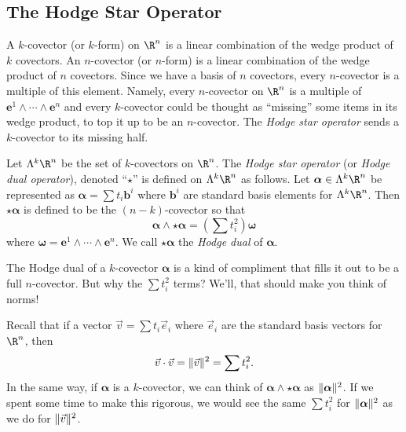 \subsection{The Hodge Star Operator}

A $k$-covector (or $k$-form) on $\R^n$ is a linear combination of the
wedge product of $k$ covectors.  An $n$-covector (or $n$-form) is a linear
combination of the wedge product of $n$ covectors.  Since we have a basis
of $n$ covectors, every $n$-covector is a multiple of this element.  Namely,
every $n$-covector on $\R^n$ is a multiple of $\bm e^1\wedge \cdots \wedge \bm e^n$
and every $k$-covector could be thought as ``missing'' some items in its wedge
product, to top it up to be an $n$-covector.  The \emph{Hodge star operator}
sends a $k$-covector to its missing half.

\begin{definition}
	Let $\Lambda^k\R^n$ be the set of $k$-covectors on $\R^n$.
	The \emph{Hodge star operator} (or \emph{Hodge dual operator}),
	denoted ``$\star$'' is defined on $\Lambda^k\R^n$ as follows.
	Let $\bm\alpha\in \Lambda^k\R^n$ be represented as
	$\bm\alpha = \sum t_i \bm b^i$ where $\bm b^i$ are standard basis
	elements for $\Lambda^k\R^n$.  Then $\star \bm\alpha$ is defined
	to be the $(n-k)$-covector so that
	\[
		\bm\alpha\wedge \star\bm\alpha = \left(\sum t_i^2\right)\bm\omega
	\]
	where $\bm\omega = \bm e^1\wedge \cdots\wedge \bm e^n$.  We call $\star\bm\alpha$
	the \emph{Hodge dual} of $\bm\alpha$.
\end{definition}

The Hodge dual of a $k$-covector $\bm\alpha$ is a kind of compliment that fills
it out to be a full $n$-covector.  But why the $\sum t_i^2$ terms?  We'll, that should
make you think of norms!

Recall that if a vector $\vec v = \sum t_i \vec e_i$ where $\vec e_i$ are the standard
basis vectors for $\R^n$, then
\[
	\vec v\cdot \vec v = \lVert\vec v\rVert^2 = \sum t_i^2.
\]
In the same way, if $\bm\alpha$ is a $k$-covector, we can think of $\bm\alpha\wedge \star
\bm\alpha$ as $\lVert\bm\alpha\rVert^2$.  If we spent some time to make this rigorous,
we would see the same $\sum t_i^2$ for $\lVert\bm\alpha\rVert^2$  as we do for $\lVert\vec v\rVert^2$.

